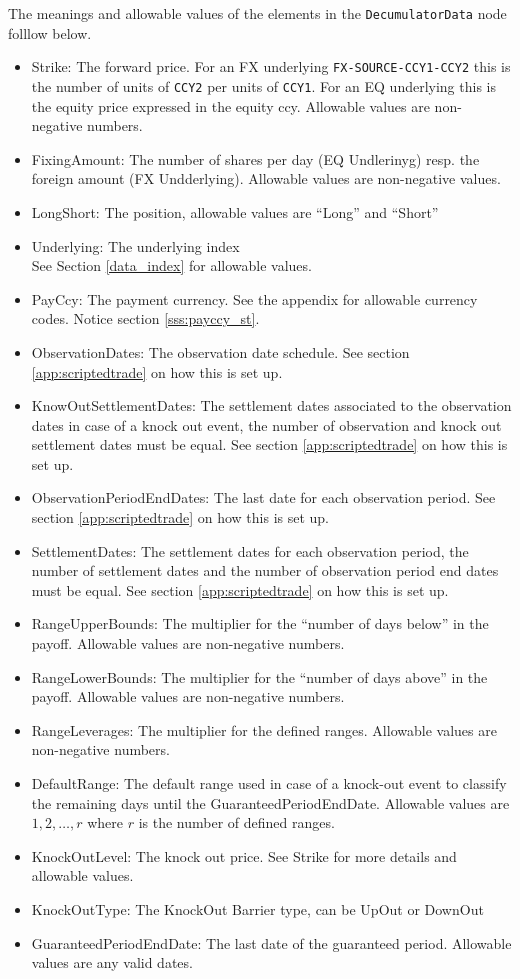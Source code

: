 The meanings and allowable values of the elements in the \verb+DecumulatorData+ node folllow below.

\begin{itemize}
\item Strike: The forward price. For an FX underlying \lstinline!FX-SOURCE-CCY1-CCY2! this is the number of units of \lstinline!CCY2! per units
  of \lstinline!CCY1!. For an EQ underlying this is the equity price expressed in the equity ccy.  Allowable values are non-negative
  numbers.
\item FixingAmount: The number of shares per day (EQ Undlerinyg) resp. the foreign amount (FX Undderlying). Allowable values
  are non-negative values.
\item LongShort: The position, allowable values are ``Long'' and ``Short''
\item Underlying:  The underlying index \\
  See Section \ref{data_index} for allowable values.
\item PayCcy: The payment currency. See the appendix for allowable currency codes.  Notice section \ref{sss:payccy_st}.
\item ObservationDates: The observation date schedule. See section \ref{app:scriptedtrade} on how this is set up.
\item KnowOutSettlementDates: The settlement dates associated to the observation dates in case of a knock out event, the
  number of observation and knock out settlement dates must be equal. See section \ref{app:scriptedtrade} on how this is
  set up.
\item ObservationPeriodEndDates: The last date for each observation period. See section \ref{app:scriptedtrade} on how
  this is set up.
\item SettlementDates: The settlement dates for each observation period, the number of settlement dates and the number
  of observation period end dates must be equal. See section \ref{app:scriptedtrade} on how this is set up.
\item RangeUpperBounds: The multiplier for the ``number of days below'' in the payoff. Allowable values are non-negative numbers.
\item RangeLowerBounds: The multiplier for the ``number of days above'' in the payoff. Allowable values are non-negative numbers.
\item RangeLeverages: The multiplier for the defined ranges. Allowable values are non-negative numbers.
\item DefaultRange: The default range used in case of a knock-out event to classify the remaining days until the
  GuaranteedPeriodEndDate. Allowable values are $1,2,\ldots,r$ where $r$ is the number of defined ranges.
\item KnockOutLevel: The knock out price. See Strike for more details and allowable values.
\item KnockOutType: The KnockOut Barrier type, can be UpOut or DownOut
\item GuaranteedPeriodEndDate: The last date of the guaranteed period. Allowable values are any valid dates.
\end{itemize}

